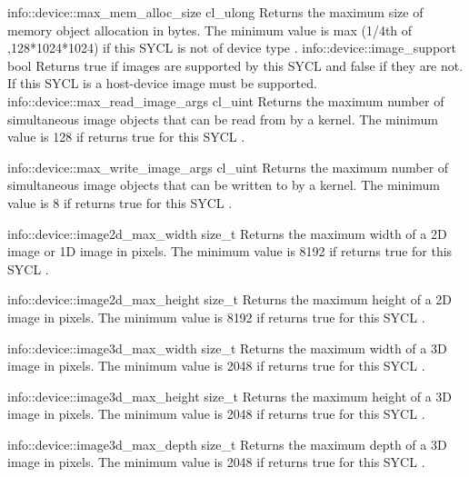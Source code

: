     \addInfoRow
     {info::device::max_mem_alloc_size}
     {cl_ulong}
     {
      Returns the maximum size of memory object allocation in  bytes. The minimum value is max (1/4th of ,128*1024*1024) if this SYCL  is not of device type .
     }
   \addInfoRow
     {info::device::image_support}
     {bool}
     {
       Returns true if images are supported by this SYCL  and
       false if they are not. If this SYCL  is a
       \gls{host-device} image must be supported.
     }
   \addInfoRow
     {info::device::max_read_image_args}
     {cl_uint}
     {
      Returns the maximum number of simultaneous image objects that can be read from by a kernel. The minimum value is 128 if  returns true for this SYCL .
        }

   \addInfoRow
     {info::device::max_write_image_args}
     {cl_uint}
     {
    Returns the maximum number of simultaneous image objects that can be written to by a kernel. The minimum value is 8 if  returns true for this SYCL .
     }

   \addInfoRow
     {info::device::image2d_max_width}
     {size_t}
     {
    Returns the maximum width of a 2D image or 1D image in pixels. The minimum value is 8192 if  returns true for this SYCL .
     }

   \addInfoRow
     {info::device::image2d_max_height}
     {size_t}
     {
    Returns the maximum height of a 2D image in pixels. The minimum value is 8192 if  returns true for this SYCL .
     }

   \addInfoRow
     {info::device::image3d_max_width}
     {size_t}
     {
     Returns the maximum width of a 3D image in pixels. The minimum value is 2048 if  returns true for this SYCL .
     }

   \addInfoRow
     {info::device::image3d_max_height}
     {size_t}
     {
     Returns the maximum height of a 3D image in pixels. The minimum value is 2048 if  returns true for this SYCL .
     }

  \addInfoRow
  {info::device::image3d_max_depth}
  {size_t}
  {
    Returns the maximum depth of a 3D image in pixels. The minimum value is 2048 if  returns true for this SYCL .
  }
  

